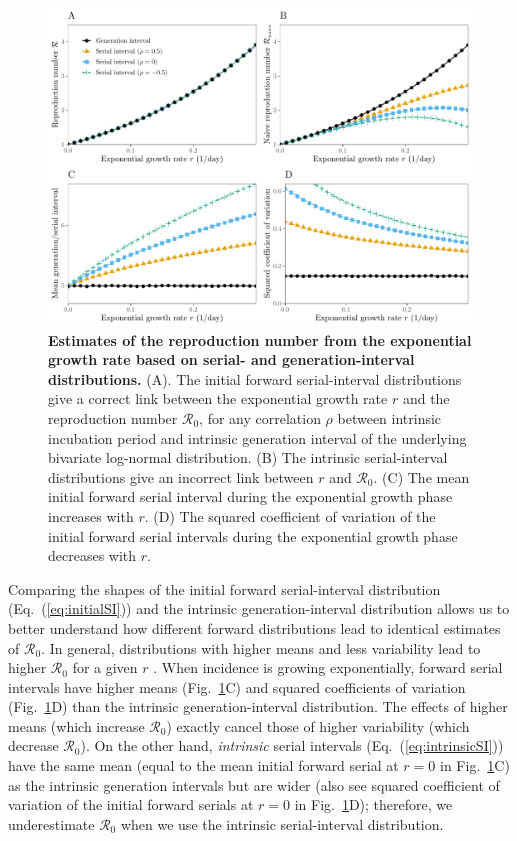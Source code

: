 \documentclass[12pt]{article}
\newcommand{\eref}[1]{Eq.~(\ref{eq:#1})}
\newcommand{\fref}[1]{Fig.~\ref{fig:#1}}
\newcommand{\Rx}[1]{\ensuremath{{\mathcal R}_{#1}}\xspace}
\newcommand{\Ro}{\Rx{0}}
\begin{document}
\begin{figure}[!th]
\includegraphics[width=\textwidth]{rR.pdf}
\caption{
\textbf{Estimates of the reproduction number from the exponential growth rate based on serial- and generation-interval distributions.}
(A). The initial forward serial-interval distributions give a correct
link between the exponential growth rate $r$ and the reproduction
number \Ro,
for any correlation $\rho$ between intrinsic incubation period and
intrinsic generation interval of the underlying bivariate log-normal distribution.
(B) The intrinsic serial-interval distributions give an incorrect link between $r$ and \Ro.
(C) The mean initial forward serial interval during the exponential growth phase increases with $r$.
(D) The squared coefficient of variation of the initial forward serial intervals during the exponential growth phase decreases with $r$.
}
\label{fig:rR}
\end{figure}

Comparing the shapes of the initial forward serial-interval distribution (\eref{initialSI}) and the intrinsic generation-interval distribution allows us to better understand how different forward distributions lead to identical estimates of \Ro.
In general, distributions with higher means and less variability lead to higher \Ro for a given $r$ \citep{wallinga2007generation, weitz2015modeling, park2019practical}.
When incidence is growing exponentially, forward serial intervals have higher means (\fref{rR}C) and squared coefficients of variation (\fref{rR}D) than the intrinsic generation-interval distribution.
The effects of higher means (which increase \Ro) exactly cancel those of higher variability (which decrease \Ro).
On the other hand, \emph{intrinsic} serial intervals (\eref{intrinsicSI}) have the same mean (equal to the mean initial forward serial at $r=0$ in \fref{rR}C) as the intrinsic generation intervals but are wider (also see squared coefficient of variation of the initial forward serials at $r=0$ in \fref{rR}D); 
therefore, we underestimate \Ro when we use the intrinsic serial-interval distribution.
\end{document}
